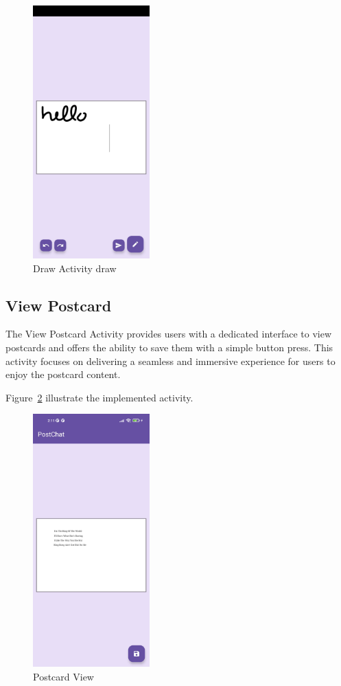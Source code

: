 \newpage

\begin{figure}[!ht]
	\centering
	\includegraphics[trim={0cm -3cm 0 -3cm}, width=0.4\textwidth]{./Chapter6/Figures/Postcard Portrait}
	\caption{Draw Activity draw}
	\label{fig:DA2}
\end{figure}

\newpage


\subsection{View Postcard}
The View Postcard Activity provides users with a dedicated interface to view postcards and offers the ability to save them with a simple button press. This activity focuses on delivering a seamless and immersive experience for users to enjoy the postcard content.

Figure~\ref{fig:VA} illustrate the implemented activity.

\begin{figure}[!ht]
	\centering
	\includegraphics[trim={0cm -3cm 0 -3cm}, width=0.4\textwidth]{./Chapter6/Figures/Postcard Save}
	\caption{Postcard View}
	\label{fig:VA}
\end{figure}

